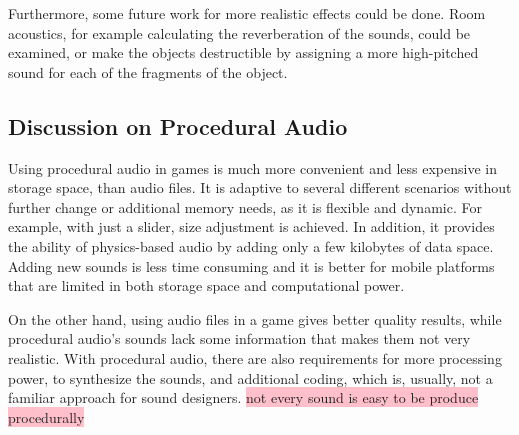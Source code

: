 Furthermore, some future work for more realistic effects could be done. Room acoustics, for example calculating the reverberation of the sounds, could be examined, or make the objects destructible by assigning a more high-pitched sound for each of the fragments of the object.

\subsection{Discussion on Procedural Audio}

Using procedural audio in games is much more convenient and less expensive in storage space, than audio files. It is adaptive to several different scenarios without further change or additional memory needs, as it is flexible and dynamic. For example, with just a slider, size adjustment is achieved. In addition, it provides the ability of physics-based audio by adding only a few kilobytes of data space. Adding new sounds is less time consuming and it is better for mobile platforms that are limited in both storage space and computational power.

On the other hand, using audio files in a game gives better quality results, while procedural audio's sounds lack some information that makes them not very realistic. With procedural audio, there are also requirements for more processing power, to synthesize the sounds, and additional coding, which is, usually, not a familiar approach for sound designers.
\colorbox{pink}{not every sound is easy to be produce procedurally}
